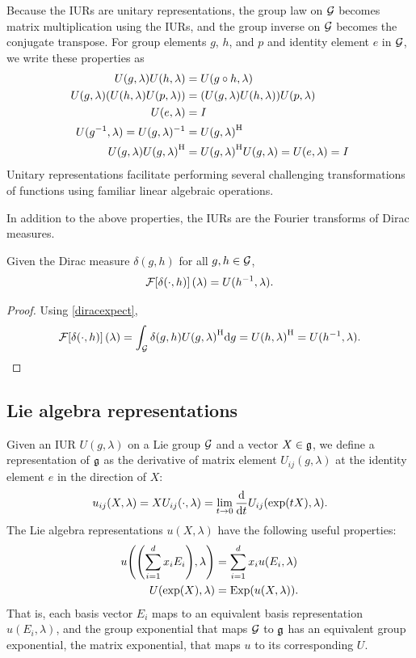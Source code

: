 \documentclass[../../main.tex]{subfiles}
\begin{document}
\begin{refsection}
	Because the IURs are unitary representations, the group law on $\mathcal{G}$ becomes matrix multiplication using the IURs, and the group inverse on $\mathcal{G}$ becomes the conjugate transpose.
	For group elements $g$, $h$, and $p$ and identity element $e$ in $\mathcal{G}$, we write these properties as
	\begin{align*}
		U(g, \lambda) U(h, \lambda)                       & = U(g \circ h, \lambda)                                   \\
		U(g, \lambda) \qty( U(h, \lambda) U(p, \lambda) ) & = \qty( U(g, \lambda) U(h, \lambda) ) U(p, \lambda)       \\
		U(e, \lambda)                                     & = I                                                       \\
		U(g^{-1}, \lambda) = U(g, \lambda)^{-1}           & = {U(g, \lambda)}^\mathrm{H}                                   \\
		U(g, \lambda) {U(g, \lambda)}^\mathrm{H}               & = {U(g, \lambda)}^\mathrm{H} U(g, \lambda) = U(e, \lambda) = I
	\end{align*}
	Unitary representations facilitate performing several challenging transformations of functions using familiar linear algebraic operations.

	In addition to the above properties, the IURs are the Fourier transforms of Dirac measures.
	\begin{theorem}\label{diracftrans}
		Given the Dirac measure $\delta(g, h)$ for all $g, h \in \mathcal{G}$,
		$$\mathcal{F}\qty[\delta(\cdot, h)](\lambda) = U(h^{-1}, \lambda).$$
	\end{theorem}
	\begin{proof}
		Using \cref{diracexpect},
		$$\mathcal{F}\qty[\delta(\cdot, h)](\lambda) = \int_{\mathcal{G}} \delta(g, h) {U(g, \lambda)}^\mathrm{H} \dd g = {U(h, \lambda)}^\mathrm{H} = U(h^{-1}, \lambda).$$
	\end{proof}

	\subsection{Lie algebra representations}\label{lie-algebra-representations}

	Given an IUR $U(g, \lambda)$ on a Lie group $\mathcal{G}$ and a vector $X \in \mathfrak{g}$, we define a representation of $\mathfrak{g}$ as the derivative of matrix element $U_{ij}(g, \lambda)$ at the identity element $e$ in the direction of $X$:
	$$u_{ij}(X, \lambda) = X U_{ij}(\cdot, \lambda) = \lim_{t \to 0} \dv{t} U_{ij}(\exp(t X), \lambda).$$
	The Lie algebra representations $u(X, \lambda)$ have the following useful properties:
	\begin{align}
		u\qty(\qty(\sum_{i=1}^d x_i E_i), \lambda) & = \sum_{i=1}^d x_i u(E_i, \lambda) \\
		U(\exp(X), \lambda)                        & = \operatorname{Exp}(u(X, \lambda)).
	\end{align}
	That is, each basis vector $E_i$ maps to an equivalent basis representation $u(E_i, \lambda)$, and the group exponential that maps $\mathcal{G}$ to $\mathfrak{g}$ has an equivalent group exponential, the matrix exponential, that maps $u$ to its corresponding $U$.


\end{refsection}
\end{document}
